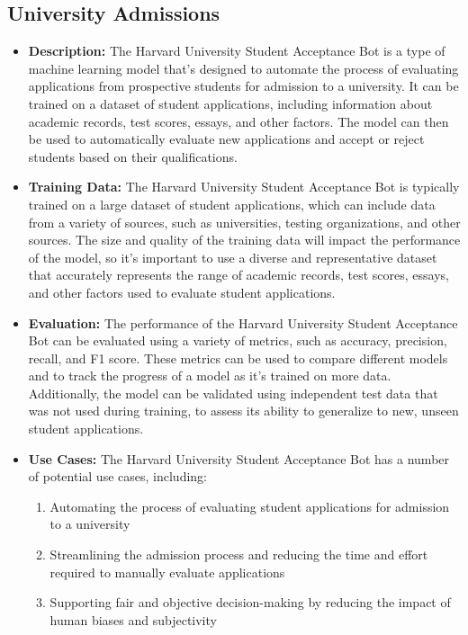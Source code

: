 \subsection{University Admissions}

\begin{itemize}
    \item \textbf{Description:} The Harvard University Student Acceptance Bot is a type of machine learning model that's designed to automate the process of evaluating applications from prospective students for admission to a university. It can be trained on a dataset of student applications, including information about academic records, test scores, essays, and other factors. The model can then be used to automatically evaluate new applications and accept or reject students based on their qualifications.
    \item \textbf{Training Data:} The Harvard University Student Acceptance Bot is typically trained on a large dataset of student applications, which can include data from a variety of sources, such as universities, testing organizations, and other sources. The size and quality of the training data will impact the performance of the model, so it's important to use a diverse and representative dataset that accurately represents the range of academic records, test scores, essays, and other factors used to evaluate student applications.
    \item \textbf{Evaluation:} The performance of the Harvard University Student Acceptance Bot can be evaluated using a variety of metrics, such as accuracy, precision, recall, and F1 score. These metrics can be used to compare different models and to track the progress of a model as it's trained on more data. Additionally, the model can be validated using independent test data that was not used during training, to assess its ability to generalize to new, unseen student applications.
    \item \textbf{Use Cases:} The Harvard University Student Acceptance Bot has a number of potential use cases, including:
        \begin{enumerate}  
            \item Automating the process of evaluating student applications for admission to a university
            \item Streamlining the admission process and reducing the time and effort required to manually evaluate applications
            \item Supporting fair and objective decision-making by reducing the impact of human biases and subjectivity

\end{enumerate}
\end{itemize}
